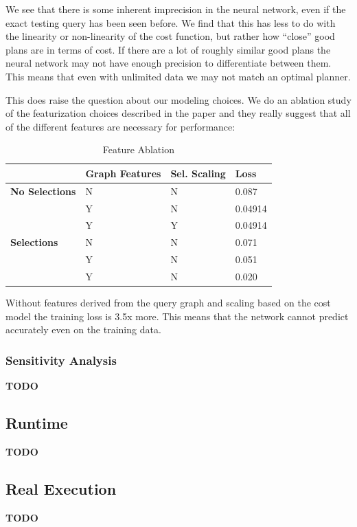 We see that there is some inherent imprecision in the neural network, even if the exact testing query has been seen before. We find that this has less to do with the linearity or non-linearity of the cost function, but rather how ``close'' good plans are in terms of cost. If there are a lot of roughly similar good plans the neural network may not have enough precision to differentiate between them.
This means that even with unlimited data we may not match an optimal planner. 

This does raise the question about our modeling choices. We do an ablation study of the featurization choices described in the paper and they really suggest that all of the different features are necessary for performance:

\begin{table}[ht!]\centering \small
\caption{Feature Ablation}\vspace{0.25em}
\begin{tabular}{|l|l|l|l|}\hline
    & {\bf Graph Features}  & {\bf Sel. Scaling}  & {\bf Loss} \\ \hline
{\bf No Selections}  & N  & N   & 0.087 \\ \hline
 & Y  & N   & 0.04914 \\ \hline
  & Y  & Y   & 0.04914 \\ \hline
\hline
{\bf Selections}  & N  & N   &  0.071\\ \hline
& Y  & N   &  0.051\\ \hline
& Y  & N   &  0.020\\ \hline
\end{tabular}
\end{table}

Without features derived from the query graph and scaling based on the cost model the training loss is 3.5x more. This means that the network cannot predict accurately even on the training data.

\subsubsection{Sensitivity Analysis}
\textbf{TODO}

\subsection{Runtime}
\textbf{TODO}

\subsection{Real Execution}
\textbf{TODO}

